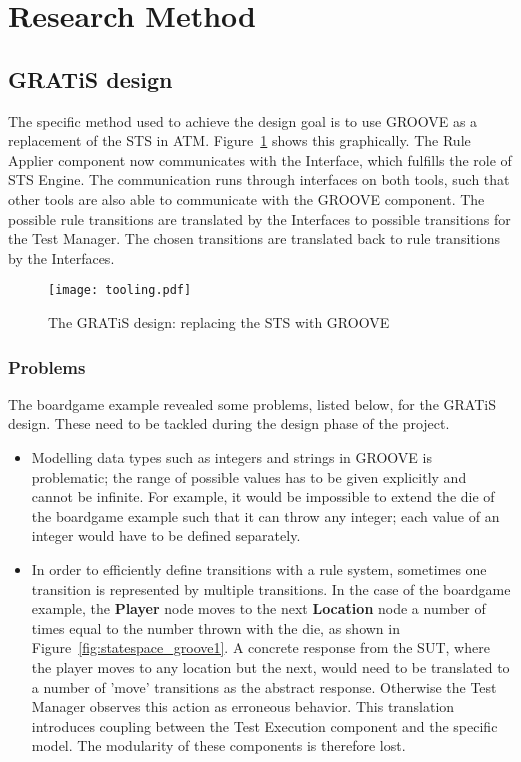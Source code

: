 \section{Research Method}\label{sec:research_methods}

\subsection{GRATiS design}
The specific method used to achieve the design goal is to use GROOVE as a replacement of the STS in ATM. Figure~\ref{fig:tooling} shows this graphically. The Rule Applier component now communicates with the Interface, which fulfills the role of STS Engine. The communication runs through interfaces on both tools, such that other tools are also able to communicate with the GROOVE component. The possible rule transitions are translated by the Interfaces to possible transitions for the Test Manager. The chosen transitions are translated back to rule transitions by the Interfaces.

\begin{figure}[h]
  \begin{center}
    \texttt{[image: tooling.pdf]}
  \end{center}
  \caption{The GRATiS design: replacing the STS with GROOVE}
  \label{fig:tooling}
\end{figure}

\subsubsection{Problems}\label{sec:problems}
The boardgame example revealed some problems, listed below, for the GRATiS design. These need to be tackled during the design phase of the project. 
\begin{itemize}
  \item Modelling data types such as integers and strings in GROOVE is problematic; the range of possible values has to be given explicitly and cannot be infinite. For example, it would be impossible to extend the die of the boardgame example such that it can throw any integer; each value of an integer would have to be defined separately.
  \item In order to efficiently define transitions with a rule system, sometimes one transition is represented by multiple transitions. In the case of the boardgame example, the \textbf{Player} node moves to the next \textbf{Location} node a number of times equal to the number thrown with the die, as shown in Figure~\ref{fig:statespace_groove1}. A concrete response from the SUT, where the player moves to any location but the next, would need to be translated to a number of 'move' transitions as the abstract response. Otherwise the Test Manager observes this action as erroneous behavior. This translation introduces coupling between the Test Execution component and the specific model. The modularity of these components is therefore lost. %
\end{itemize}

